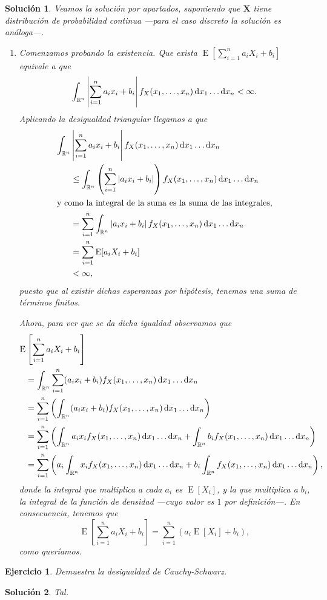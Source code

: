 \documentclass[
  a4paper,
  spanish,
  12pt,
]{scrartcl}
\theoremstyle{ejercicio-style}
\newtheorem{ejer}{Ejercicio}
\theoremstyle{remark-style}
\newtheorem*{sol}{Solución}
\begin{document}
\begin{sol}
  Veamos la solución por apartados, suponiendo que \(\symbf{X} \) tiene distribución de probabilidad continua ---para el caso discreto la solución es análoga---. \begin{enumerate}
    \item Comenzamos probando la existencia. Que exista \(\operatorname{E}\left[\sum_{i=1}^n a_iX_i + b_i\right]\) equivale a que \[
      \int_{\mathbb R^n}\left|\sum_{i=1}^n a_ix_i + b_i\right| f_X(x_1, \dots, x_n)\dif x_1\dots\dif x_n < \infty.
    \] Aplicando la desigualdad triangular llegamos a que \begin{align*}
      \int_{\mathbb R^n}&\left|\sum_{i=1}^n a_ix_i + b_i\right| f_X(x_1, \dots, x_n)\dif x_1\dots\dif x_n\\
        &\leq \int_{\mathbb R^n}\left(\sum_{i=1}^n \left|a_ix_i + b_i\right|\right) f_X(x_1, \dots, x_n)\dif x_1\dots\dif x_n\\
        \intertext{y como la integral de la suma es la suma de las integrales,}
        &= \sum_{i=1}^n\int_{\mathbb R^n}\left|a_ix_i + b_i\right| f_X(x_1, \dots, x_n)\dif x_1\dots\dif x_n\\
        &= \sum_{i=1}^n \operatorname{E}[a_iX_i + b_i]\\
        &< \infty,
    \end{align*} puesto que al existir dichas esperanzas por hipótesis, tenemos una suma de términos finitos.

    Ahora, para ver que se da dicha igualdad observamos que \begin{align*}
      \operatorname{E}&\left[\sum_{i=1}^n a_iX_i + b_i\right] \\
        &= \int_{\mathbb R^n}\sum_{i=1}^n (a_ix_i + b_i) f_X(x_1, \dots, x_n)\dif x_1\dots\dif x_n\\
        &= \sum_{i=1}^n\left(\int_{\mathbb R^n} (a_ix_i + b_i) f_X(x_1, \dots, x_n)\dif x_1\dots\dif x_n\right)\\
        &= \sum_{i=1}^n\left(\int_{\mathbb R^n} a_ix_if_X(x_1, \dots, x_n)\dif x_1\dots\dif x_n + \int_{\mathbb R^n} b_if_X(x_1, \dots, x_n)\dif x_1\dots\dif x_n\right)\\
        &= \sum_{i=1}^n\left(a_i\int_{\mathbb R^n}x_if_X(x_1, \dots, x_n)\dif x_1\dots\dif x_n + b_i\int_{\mathbb R^n} f_X(x_1, \dots, x_n)\dif x_1\dots\dif x_n\right),
    \end{align*} donde la integral que multiplica a cada \(a_i\) es \(\operatorname{E}[X_i]\), y la que multiplica a \(b_i\), la integral de la función de densidad ---cuyo valor es \(1\) por definición---. En consecuencia, tenemos que \[
      \operatorname{E}\left[\sum_{i=1}^n a_iX_i + b_i\right] = \sum_{i=1}^n\left(a_i \operatorname{E}[X_i] + b_i\right),
    \] como queríamos.
  \end{enumerate}
\end{sol}

\begin{ejer}
  Demuestra la desigualdad de Cauchy-Schwarz.
\end{ejer}

\begin{sol}
  Tal.
\end{sol}
\end{document}
